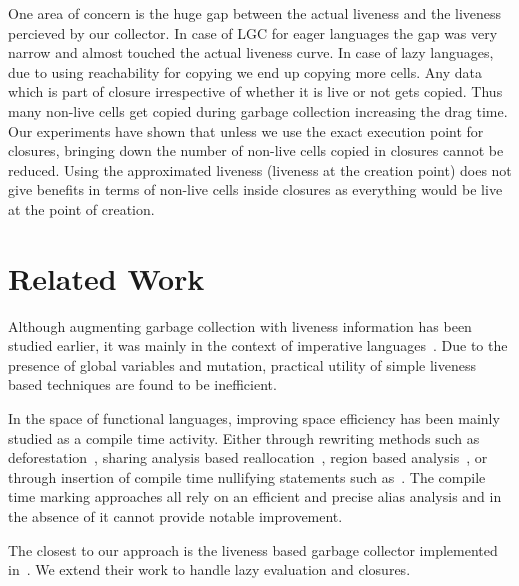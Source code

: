 \documentclass[9pt]{sigplanconf}
\begin{document}
One area  of concern is the  huge gap between the  actual liveness and
the liveness  percieved by  our collector.  In case  of LGC  for eager
languages  the gap  was  very  narrow and  almost  touched the  actual
liveness curve.  In case of  lazy languages, due to using reachability
for copying we  end up copying more  cells. Any data which  is part of
closure irrespective  of whether it is  live or not gets  copied. Thus
many non-live  cells get  copied during garbage  collection increasing
the drag  time.  Our  experiments have  shown that  unless we  use the
exact  execution  point  for  closures, bringing  down  the  number  of
non-live  cells  copied in  closures  cannot  be reduced.   Using  the
approximated liveness (liveness  at the creation point)  does not give
benefits  in terms  of non-live  cells inside  closures as  everything
would be live at the point of creation.

\section{Related Work} 
\label{sec:relatedwork}
Although augmenting  garbage collection with liveness  information has
been  studied earlier,  it was  mainly  in the  context of  imperative
languages~\cite{Albert,  Hirzel}.  Due  to   the  presence  of  global
variables  and mutation,  practical utility  of simple  liveness based
techniques are found to be inefficient.

In the space  of functional languages, improving  space efficiency has
been  mainly  studied  as  a compile  time  activity.  Either  through
rewriting                methods                such                as
deforestation~\cite{wadler88deforest,gill93ashort,chitil99deforest},
sharing  analysis   based  reallocation~\cite{jones89compile},  region
based  analysis~\cite{tofte98region}, or  through insertion  of compile
time              nullifying              statements              such
as~\cite{inoue88analysis,lee05static,Hamilton}.    The  compile   time
marking approaches all rely on an efficient and precise alias analysis
and in the absence of it cannot provide notable improvement.

The closest  to our approach  is the liveness based  garbage collector
implemented in~\cite{asati14lgc}. We extend  their work to handle lazy
evaluation and closures.
 

\end{document}
